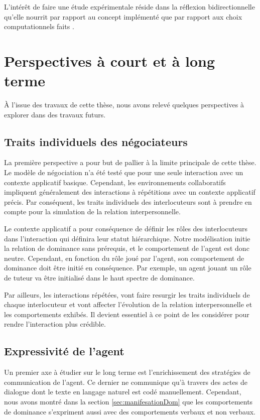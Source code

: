 L'intérêt de faire une étude expérimentale réside dans la réflexion bidirectionnelle qu’elle nourrit par rapport au concept implémenté que par rapport aux choix computationnels faits \cite{faur2016approche}.

\section{Perspectives à court et à long terme}

À l’issue des travaux de cette thèse, nous avons relevé quelques perspectives à explorer dans des travaux futurs.

\subsection{Traits individuels des négociateurs}

La première perspective a pour but de pallier à la limite principale de cette thèse. Le modèle de négociation n'a été testé que pour une seule interaction avec un contexte applicatif basique. Cependant, les environnements collaboratifs impliquent généralement des interactions à répétitions avec un contexte applicatif précis. Par conséquent, les traits individuels des interlocuteurs sont à prendre en compte pour la simulation de la relation interpersonnelle. 

Le contexte applicatif a pour conséquence de définir les rôles des interlocuteurs dans l'interaction qui définira leur statut hiérarchique. Notre modélisation initie la relation de dominance sans prérequis, et le comportement de l'agent est donc neutre. Cependant, en fonction du rôle joué par l'agent, son comportement de dominance doit être initié en conséquence. Par exemple, un agent jouant un rôle de tuteur va être initialisé dans le haut spectre de dominance. 

Par ailleurs, les interactions répétées, vont faire resurgir les traits individuels de chaque interlocuteur et vont affecter l'évolution de la relation interpersonnelle et les comportements exhibés. Il devient essentiel à ce point de les considérer pour rendre l'interaction plus crédible.

\subsection{Expressivité de l'agent}

Un premier axe à étudier sur le long terme est l'enrichissement des stratégies de communication de l'agent. Ce dernier ne communique qu'à travers des actes de dialogue dont le texte en langage naturel est codé manuellement. Cependant, nous avons montré dans la section \ref{sec:manifesationDom} que les comportements de dominance s'expriment aussi avec des comportements verbaux et non verbaux.


